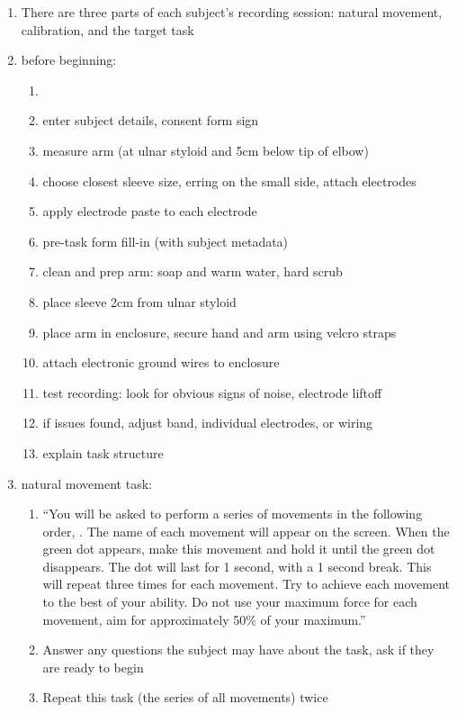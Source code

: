 \documentclass[../main.tex]{subfiles}
\begin{document}
\begin{enumerate}
  \item There are three parts of each subject's recording session: natural movement, calibration, and the target task
  \item before beginning:
  \begin{enumerate}
    \item 
    \item enter subject details, consent form sign
    \item measure arm (at ulnar styloid and 5cm below tip of elbow)
    \item choose closest sleeve size, erring on the small side, attach electrodes
    \item apply electrode paste to each electrode
    \item pre-task form fill-in (with subject metadata)
    \item clean and prep arm: soap and warm water, hard scrub
    \item place sleeve 2cm from ulnar styloid
    \item place arm in enclosure, secure hand and arm using velcro straps
    \item attach electronic ground wires to enclosure
    \item test recording: look for obvious signs of noise, electrode liftoff
    \item if issues found, adjust band, individual electrodes, or wiring
    \item explain task structure
  \end{enumerate}
  \item natural movement task:
  \begin{enumerate}
    \item ``You will be asked to perform a series of movements in the following order, \rbrack. The name of each movement will appear on the screen. When the green dot appears, make this movement and hold it until the green dot disappears. The dot will last for 1 second, with a 1 second break. This will repeat three times for each movement. Try to achieve each movement to the best of your ability. Do not use your maximum force for each movement, aim for approximately 50\% of your maximum.''
    \item Answer any questions the subject may have about the task, ask if they are ready to begin
    \item Repeat this task (the series of all movements) twice 

\end{enumerate}
\end{enumerate}
\end{document}

